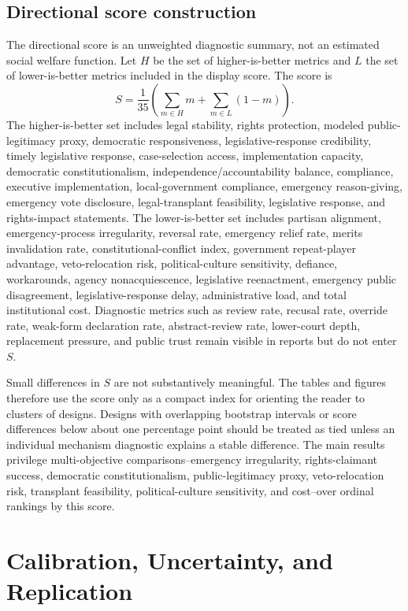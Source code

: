 \documentclass[
  journal=small,
  manuscript=research-article,
  year=2026
]{cup-journal}
\begin{document}
\subsection{Directional score construction}

The directional score is an unweighted diagnostic summary, not an estimated social welfare function. Let $H$ be the set of higher-is-better metrics and $L$ the set of lower-is-better metrics included in the display score. The score is
\[
S=\frac{1}{35}\left(\sum_{m\in H}m+\sum_{m\in L}(1-m)\right).
\]
The higher-is-better set includes legal stability, rights protection, modeled public-legitimacy proxy, democratic responsiveness, legislative-response credibility, timely legislative response, case-selection access, implementation capacity, democratic constitutionalism, independence/accountability balance, compliance, executive implementation, local-government compliance, emergency reason-giving, emergency vote disclosure, legal-transplant feasibility, legislative response, and rights-impact statements. The lower-is-better set includes partisan alignment, emergency-process irregularity, reversal rate, emergency relief rate, merits invalidation rate, constitutional-conflict index, government repeat-player advantage, veto-relocation risk, political-culture sensitivity, defiance, workarounds, agency nonacquiescence, legislative reenactment, emergency public disagreement, legislative-response delay, administrative load, and total institutional cost. Diagnostic metrics such as review rate, recusal rate, override rate, weak-form declaration rate, abstract-review rate, lower-court depth, replacement pressure, and public trust remain visible in reports but do not enter $S$.

Small differences in $S$ are not substantively meaningful. The tables and figures therefore use the score only as a compact index for orienting the reader to clusters of designs. Designs with overlapping bootstrap intervals or score differences below about one percentage point should be treated as tied unless an individual mechanism diagnostic explains a stable difference. The main results privilege multi-objective comparisons--emergency irregularity, rights-claimant success, democratic constitutionalism, public-legitimacy proxy, veto-relocation risk, transplant feasibility, political-culture sensitivity, and cost--over ordinal rankings by this score.

\section{Calibration, Uncertainty, and Replication}
\label{sec:calibration}
\end{document}
